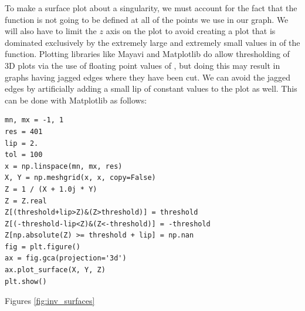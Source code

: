 To make a surface plot about a singularity, we must account for the fact that the function is not going to be defined at all of the points we use in our graph.
We will also have to limit the $z$ axis on the plot to avoid creating a plot that is dominated exclusively by the extremely large and extremely small values in of the function.
Plotting libraries like Mayavi and Matplotlib do allow thresholding of 3D plots via the use of floating point values of , but doing this may result in graphs having jagged edges where they have been cut.
We can avoid the jagged edges by artificially adding a small lip of constant values to the plot as well.
This can be done with Matplotlib as follows:
\begin{lstlisting}
mn, mx = -1, 1
res = 401
lip = 2.
tol = 100
x = np.linspace(mn, mx, res)
X, Y = np.meshgrid(x, x, copy=False)
Z = 1 / (X + 1.0j * Y)
Z = Z.real
Z[(threshold+lip>Z)&(Z>threshold)] = threshold
Z[(-threshold-lip<Z)&(Z<-threshold)] = -threshold
Z[np.absolute(Z) >= threshold + lip] = np.nan
fig = plt.figure()
ax = fig.gca(projection='3d')
ax.plot_surface(X, Y, Z)
plt.show()
\end{lstlisting}

Figures \ref{fig:inv_surfaces} %

